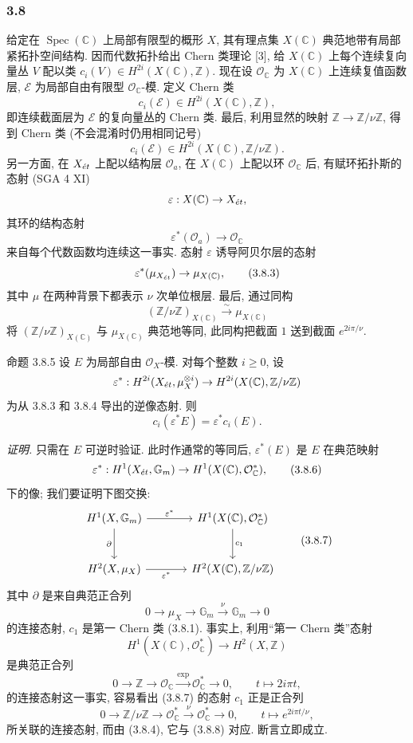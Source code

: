 \subsubsection*{3.8}
给定在 $\operatorname{Spec}(\mathbb C)$ 上局部有限型的概形 $X$, 其有理点集 $X(\mathbb C)$ 典范地带有局部紧拓扑空间结构. 因而代数拓扑给出 Chern 类理论 [3], 给 $X(\mathbb C)$ 上每个连续复向量丛 $V$ 配以类 $c_i(V)\in H^{2i}(X(\mathbb C),\mathbb Z)$. 现在设 $\mathcal O_\mathbb C$ 为 $X(\mathbb C)$ 上连续复值函数层, $\mathcal E$ 为局部自由有限型 $\mathcal O_\mathbb C$-模. 定义 Chern 类
\[
c_i(\mathcal E)\in H^{2i}(X(\mathbb C),\mathbb Z),
\]
即连续截面层为 $\mathcal E$ 的复向量丛的 Chern 类. 最后, 利用显然的映射 $\mathbb Z\to\mathbb Z/\nu\mathbb Z$, 得到 Chern 类 (不会混淆时仍用相同记号)
\[
c_i(\mathcal E)\in H^{2i}(X(\mathbb C),\mathbb Z/\nu\mathbb Z).
\tag{3.8.1}
\]
另一方面, 在 $X_{\acute{e}t}$ 上配以结构层 $\mathcal O_a$, 在 $X(\mathbb C)$ 上配以环 $\mathcal O_\mathbb C$ 后, 有赋环拓扑斯的态射 (SGA 4 XI)
\[
\varepsilon:X(\mathbb C)\to X_{\acute{e}t},
\]
其环的结构态射
\[
\varepsilon^*(\mathcal O_a)\to\mathcal O_\mathbb C
\tag{3.8.2}
\]
来自每个代数函数均连续这一事实. 态射 $\varepsilon$ 诱导阿贝尔层的态射
\[
\varepsilon^*(\mu_{X_{\acute{e}t}})\to \mu_{X(\mathbb C)},
\tag{3.8.3}
\]
其中 $\mu$ 在两种背景下都表示 $\nu$ 次单位根层. 最后, 通过同构
\[
(\mathbb Z/\nu\mathbb Z)_{X(\mathbb C)}
 \xrightarrow{\sim}\mu_{X(\mathbb C)}
\tag{3.8.4}
\]
将 $(\mathbb Z/\nu\mathbb Z)_{X(\mathbb C)}$ 与 $\mu_{X(\mathbb C)}$ 典范地等同, 此同构把截面 $1$ 送到截面 $e^{2i\pi/\nu}$.

\begin{statement}{命题 3.8.5}
设 $E$ 为局部自由 $\mathcal O_X$-模. 对每个整数 $i\ge0$, 设
\[
\varepsilon^*:H^{2i}(X_{\acute{e}t},\mu_X^{\otimes i})
\to H^{2i}(X(\mathbb C),\mathbb Z/\nu\mathbb Z)
\]
为从 3.8.3 和 3.8.4 导出的逆像态射. 则
\[
c_i(\varepsilon^*E)=\varepsilon^*c_i(E).
\]
\end{statement}

\emph{证明.} 只需在 $E$ 可逆时验证. 此时作通常的等同后, $\varepsilon^*(E)$ 是 $E$ 在典范映射
\[
\varepsilon^*:H^1(X_{\acute{e}t},\mathbb G_m)\to H^1(X(\mathbb C),\mathcal O_\mathbb C^*),
\tag{3.8.6}
\]
下的像; 我们要证明下图交换:
\[
\begin{tikzcd}[column sep=large,row sep=large]
H^1(X,\mathbb G_m) \arrow[r,"\varepsilon^*"] \arrow[d,"\partial"'] &
H^1(X(\mathbb C),\mathcal O_\mathbb C^*) \arrow[d,"c_1"]\\
H^2(X,\mu_X) \arrow[r,"\varepsilon^*"'] &
H^2(X(\mathbb C),\mathbb Z/\nu\mathbb Z)
\end{tikzcd}
\tag{3.8.7}
\]
其中 $\partial$ 是来自典范正合列
\[
0\to \mu_X\to\mathbb G_m\xrightarrow{\nu}\mathbb G_m\to0
\tag{3.8.8}
\]
的连接态射, $c_1$ 是第一 Chern 类 (3.8.1). 事实上, 利用“第一 Chern 类”态射
\[
H^1(X(\mathbb C),\mathcal O_\mathbb C^*)\to H^2(X,\mathbb Z)
\]
是典范正合列
\[
0\to\mathbb Z\to\mathcal O_\mathbb C\xrightarrow{\exp}\mathcal O_\mathbb C^*\to0,
\qquad
t\mapsto 2i\pi t,
\]
的连接态射这一事实, 容易看出 (3.8.7) 的态射 $c_1$ 正是正合列
\[
0\to\mathbb Z/\nu\mathbb Z\to\mathcal O_\mathbb C^*\xrightarrow{\nu}\mathcal O_\mathbb C^*\to0,
\qquad
t\mapsto e^{2i\pi t/\nu},
\]
所关联的连接态射, 而由 (3.8.4), 它与 (3.8.8) 对应. 断言立即成立.

